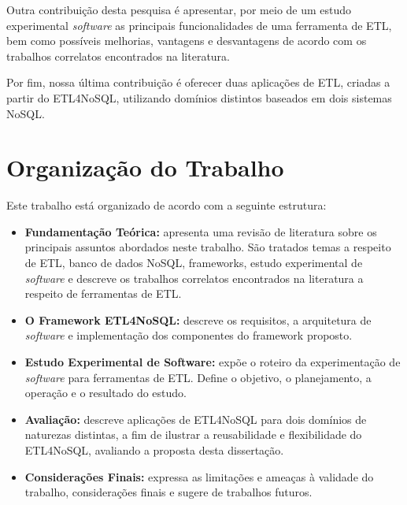 Outra contribuição desta pesquisa é apresentar, por meio de um estudo experimental \textit{software} as principais funcionalidades de uma ferramenta de ETL, bem como possíveis melhorias, vantagens e desvantagens de acordo com os trabalhos correlatos encontrados na literatura.

Por fim, nossa última contribuição é oferecer duas aplicações de ETL, criadas a partir do ETL4NoSQL, utilizando domínios distintos baseados em dois sistemas NoSQL. 


\section{Organização do Trabalho}

Este trabalho está organizado de acordo com a seguinte estrutura:

\begin{itemize}
	\item \textbf{Fundamentação Teórica:} apresenta uma revisão de literatura sobre os principais assuntos abordados neste trabalho. São tratados temas a respeito de ETL, banco de dados NoSQL, frameworks, estudo experimental de \textit{software} e descreve os trabalhos correlatos encontrados na literatura a respeito de ferramentas de ETL.
	
	\item \textbf{O Framework ETL4NoSQL:} descreve os requisitos, a arquitetura de \textit{software} e implementação dos componentes do framework proposto.
			
	\item \textbf{Estudo Experimental de Software:} expõe o roteiro da experimentação de \textit{software} para ferramentas de ETL. Define o objetivo, o planejamento, a operação e o resultado do estudo.
	
	\item \textbf{Avaliação:} descreve aplicações de ETL4NoSQL para dois domínios de naturezas distintas, a fim de ilustrar a reusabilidade e flexibilidade do ETL4NoSQL, avaliando a proposta desta dissertação.
		
	\item \textbf{Considerações Finais:} expressa as limitações e ameaças à validade do trabalho, considerações finais e sugere de trabalhos futuros.	
	
\end{itemize}

